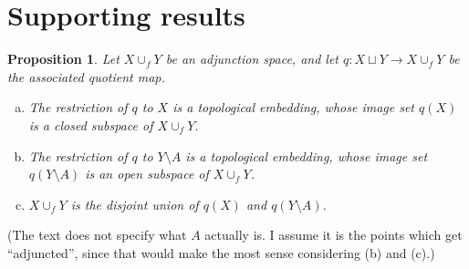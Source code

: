 \documentclass{article}
\newtheorem{proposition}[theorem]{Proposition}
\theoremstyle{definition}
\begin{document}
\section*{Supporting results}
\renewcommand{\thetheorem}{3.77}
\begin{proposition}
Let $X \cup_f Y$ be an adjunction space, and let $q : X \sqcup Y \to X \cup_f Y$ be the
associated quotient map.
\begin{enumerate}[(a)]
\item The restriction of $q$ to $X$ is a topological embedding, whose image set $q(X)$ is 
a closed subspace of $X \cup_f Y$.
\item The restriction of $q$ to $Y \setminus A$ is a topological embedding, whose image set
$q(Y \setminus A)$ is an open subspace of $X \cup_f Y$.
\item $X \cup_f Y$ is the disjoint union of $q(X)$ and $q(Y \setminus A)$.
\end{enumerate}
\end{proposition}
(The text does not specify what $A$ actually is. I assume it is the points which get 
``adjuncted'', since that would make the most sense considering (b) and (c).)
\end{document}
